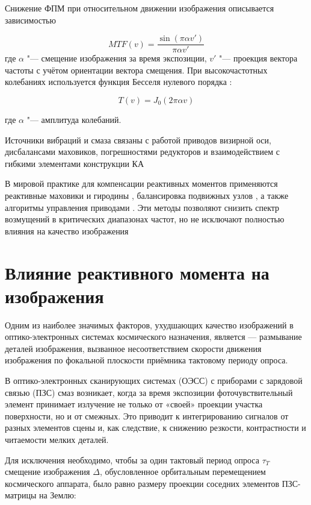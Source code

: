 Снижение ФПМ при относительном движении изображения описывается зависимостью \cite{}
	
\begin{equation}
	\label{eq:eq_MTF}
	MTF(v)=\frac{\sin (\pi \alpha v')}{\pi \alpha v'}
\end{equation}
где \(\alpha\) "--- смещение изображения за время экспозиции, \(v'\) "--- проекция вектора частоты с учётом ориентации вектора смещения. При высокочастотных колебаниях используется функция Бесселя нулевого порядка \cite{}:

\begin{equation}
	\label{eq:eq_Bessel}
	T(v)=J_0(2\pi \alpha v)
\end{equation}

где \(\alpha\) "--- амплитуда колебаний.

Источники вибраций и смаза связаны с работой приводов визирной оси, дисбалансами маховиков, погрешностями редукторов и взаимодействием с гибкими элементами конструкции КА \cite{}

В мировой практике для компенсации реактивных моментов применяются реактивные маховики и гиродины \cite{}, балансировка подвижных узлов \cite{}, а также алгоритмы управления приводами \cite{}. Эти методы позволяют снизить спектр возмущений в критических диапазонах частот, но не исключают полностью влияния на качество изображения %

 

\section{Влияние реактивного момента на \blur{} изображения}

Одним из наиболее значимых факторов, ухудшающих качество изображений в оптико-электронных системах космического назначения, является \blur{} — размывание деталей изображения, вызванное несоответствием скорости движения изображения по фокальной плоскости приёмника тактовому периоду опроса.

В оптико-электронных сканирующих системах (ОЭСС) с приборами с зарядовой связью (ПЗС) смаз возникает, когда за время экспозиции фоточувствительный элемент принимает излучение не только от «своей» проекции участка поверхности, но и от смежных. Это приводит к интегрированию сигналов от разных элементов сцены и, как следствие, к снижению резкости, контрастности и читаемости мелких деталей.

Для исключения \blur{} необходимо, чтобы за один тактовый период опроса $\tau_T$ смещение изображения $\Delta$, обусловленное орбитальным перемещением космического аппарата, было равно размеру проекции соседних элементов ПЗС-матрицы на Землю:

